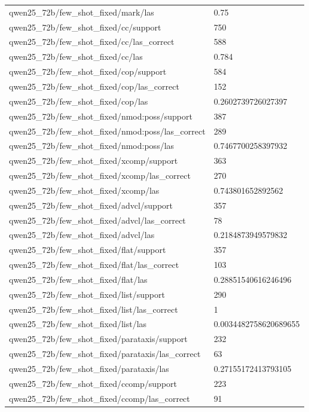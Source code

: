 \begin{tabular}{ll}
qwen25\_72b/few\_shot\_fixed/mark/las & 0.75 \\
qwen25\_72b/few\_shot\_fixed/cc/support & 750 \\
qwen25\_72b/few\_shot\_fixed/cc/las\_correct & 588 \\
qwen25\_72b/few\_shot\_fixed/cc/las & 0.784 \\
qwen25\_72b/few\_shot\_fixed/cop/support & 584 \\
qwen25\_72b/few\_shot\_fixed/cop/las\_correct & 152 \\
qwen25\_72b/few\_shot\_fixed/cop/las & 0.2602739726027397 \\
qwen25\_72b/few\_shot\_fixed/nmod:poss/support & 387 \\
qwen25\_72b/few\_shot\_fixed/nmod:poss/las\_correct & 289 \\
qwen25\_72b/few\_shot\_fixed/nmod:poss/las & 0.7467700258397932 \\
qwen25\_72b/few\_shot\_fixed/xcomp/support & 363 \\
qwen25\_72b/few\_shot\_fixed/xcomp/las\_correct & 270 \\
qwen25\_72b/few\_shot\_fixed/xcomp/las & 0.743801652892562 \\
qwen25\_72b/few\_shot\_fixed/advcl/support & 357 \\
qwen25\_72b/few\_shot\_fixed/advcl/las\_correct & 78 \\
qwen25\_72b/few\_shot\_fixed/advcl/las & 0.2184873949579832 \\
qwen25\_72b/few\_shot\_fixed/flat/support & 357 \\
qwen25\_72b/few\_shot\_fixed/flat/las\_correct & 103 \\
qwen25\_72b/few\_shot\_fixed/flat/las & 0.28851540616246496 \\
qwen25\_72b/few\_shot\_fixed/list/support & 290 \\
qwen25\_72b/few\_shot\_fixed/list/las\_correct & 1 \\
qwen25\_72b/few\_shot\_fixed/list/las & 0.0034482758620689655 \\
qwen25\_72b/few\_shot\_fixed/parataxis/support & 232 \\
qwen25\_72b/few\_shot\_fixed/parataxis/las\_correct & 63 \\
qwen25\_72b/few\_shot\_fixed/parataxis/las & 0.27155172413793105 \\
qwen25\_72b/few\_shot\_fixed/ccomp/support & 223 \\
qwen25\_72b/few\_shot\_fixed/ccomp/las\_correct & 91 \\

\end{tabular}
